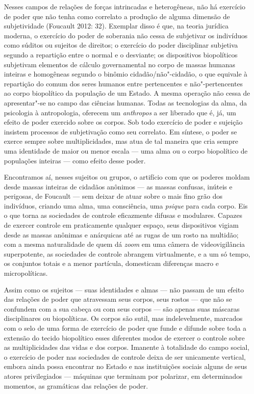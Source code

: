 Nesses campos de relações de forças intrincadas e heterogêneas, não há
exercício de poder que não tenha como correlato a produção de alguma
dimensão de subjetividade (Foucault 2012: 32). Exemplar disso é que, na
teoria jurídica moderna, o exercício do poder de soberania não cessa de
subjetivar os indivíduos como súditos ou sujeitos de direitos; o
exercício do poder disciplinar subjetiva segundo a repartição entre o
normal e o desviante; os dispositivos biopolíticos subjetivam elementos
de cálculo governamental no corpo de massas humanas inteiras e
homogêneas segundo o binômio cidadão/não"-cidadão, o que equivale à
repartição do comum dos seres humanos entre pertencentes e
não"-pertencentes ao corpo biopolítico da população de um Estado. A mesma
operação não cessa de apresentar"-se no campo das ciências humanas. Todas
as tecnologias da alma, da psicologia à antropologia, oferecem um
\emph{anthropos} a ser liberado que é, já, um efeito de poder exercido
sobre os corpos. Sob todo exercício de poder e sujeição insistem
processos de subjetivação como seu correlato. Em síntese, o poder se
exerce sempre sobre multiplicidades, mas atua de tal maneira que cria
sempre uma identidade de maior ou menor escala --- uma alma ou o corpo
biopolítico de populações inteiras --- como efeito desse poder.

Encontramos aí, nesses sujeitos ou grupos, o artifício com que os
poderes moldam desde massas inteiras de cidadãos anônimos --- as massas
confusas, inúteis e perigosas, de Foucault --- sem deixar de atuar sobre
o mais fino grão dos indivíduos, criando uma alma, uma consciência, uma
\emph{psique} para cada corpo. Eis o que torna as sociedades de controle
eficazmente difusas e modulares. Capazes de exercer controle em
praticamente qualquer espaço, seus dispositivos vigiam desde as massas
anônimas e anárquicas até as rugas de um rosto na multidão; com a mesma
naturalidade de quem dá \emph{zoom} em uma câmera de videovigilância
superpotente, as sociedades de controle abrangem virtualmente, e a um só
tempo, os conjuntos totais e a menor partícula, domesticam diferenças
macro e micropolíticas.

Assim como os sujeitos --- suas identidades e almas --- não passam de um
efeito das relações de poder que atravessam seus corpos, seus rostos ---
que não se confundem com a sua cabeça ou com seus corpos --- são apenas
suas máscaras disciplinares ou biopolíticas. Os corpos são sutil, mas
indelevelmente, marcados com o selo de uma forma de exercício de poder
que funde e difunde sobre toda a extensão do tecido biopolítico esses
diferentes modos de exercer o controle sobre as multiplicidades das
vidas e dos corpos. Imanente à totalidade do campo social, o exercício
de poder nas sociedades de controle deixa de ser unicamente vertical,
embora ainda possa encontrar no Estado e nas instituições sociais alguns
de seus atores privilegiados --- máquinas que terminam por polarizar, em
determinados momentos, as gramáticas das relações de poder.

